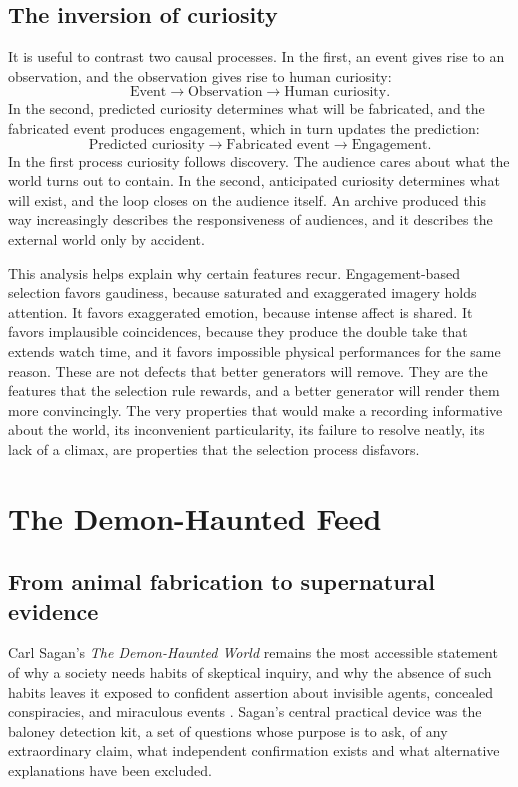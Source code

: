 \documentclass[12pt]{article}
\theoremstyle{plain}
\theoremstyle{definition}
\theoremstyle{remark}
\begin{document}
\subsection{The inversion of curiosity}

It is useful to contrast two causal processes. In the first, an event gives rise to an observation, and the observation gives rise to human curiosity:
\[
\text{Event} \rightarrow \text{Observation} \rightarrow \text{Human curiosity}.
\]
In the second, predicted curiosity determines what will be fabricated, and the fabricated event produces engagement, which in turn updates the prediction:
\[
\text{Predicted curiosity} \rightarrow \text{Fabricated event} \rightarrow \text{Engagement}.
\]
In the first process curiosity follows discovery. The audience cares about what the world turns out to contain. In the second, anticipated curiosity determines what will exist, and the loop closes on the audience itself. An archive produced this way increasingly describes the responsiveness of audiences, and it describes the external world only by accident.

This analysis helps explain why certain features recur. Engagement-based selection favors gaudiness, because saturated and exaggerated imagery holds attention. It favors exaggerated emotion, because intense affect is shared. It favors implausible coincidences, because they produce the double take that extends watch time, and it favors impossible physical performances for the same reason. These are not defects that better generators will remove. They are the features that the selection rule rewards, and a better generator will render them more convincingly. The very properties that would make a recording informative about the world, its inconvenient particularity, its failure to resolve neatly, its lack of a climax, are properties that the selection process disfavors.

\section{The Demon-Haunted Feed}

\subsection{From animal fabrication to supernatural evidence}

Carl Sagan's \emph{The Demon-Haunted World} remains the most accessible statement of why a society needs habits of skeptical inquiry, and why the absence of such habits leaves it exposed to confident assertion about invisible agents, concealed conspiracies, and miraculous events \cite{sagan1995}. Sagan's central practical device was the baloney detection kit, a set of questions whose purpose is to ask, of any extraordinary claim, what independent confirmation exists and what alternative explanations have been excluded.
\end{document}
